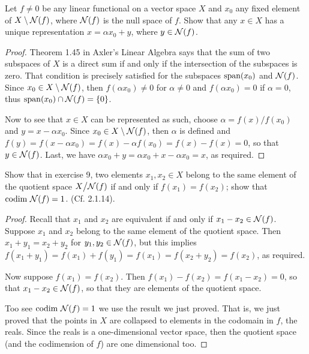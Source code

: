 \begin{exercise}{9}
Let $f\neq 0$ be any linear functional on a vector space $X$ and $x_0$ any fixed element of $X\setminus \mathcal{N}(f)$, where $\mathcal{N}(f)$ is the null space of $f$.
Show that any $x\in X$ has a unique representation $x=\alpha x_0+y$, where $y\in\mathcal{N}(f)$.
\end{exercise}
\begin{proof}
Theorem 1.45 in Axler's Linear Algebra says that the sum of two subspaces of $X$ is a direct sum if and only if the intersection of the subspaces is zero.
That condition is precisely satisfied for the subspaces $\operatorname*{span}(x_0)$ and $\mathcal{N}(f)$.
Since $x_0\in X\setminus\mathcal{N}(f)$, then $f(\alpha x_0)\neq 0$ for $\alpha\neq 0$ and $f(\alpha x_0)=0$ if $\alpha=0$, thus $\operatorname*{span}(x_0)\cap \mathcal{N}(f)=\{0\}$.

Now to see that $x\in X$ can be represented as such, choose $\alpha = f(x)/f(x_0)$ and $y=x-\alpha x_0$.
Since $x_0\in X\setminus\mathcal{N}(f)$, then $\alpha$ is defined and $f(y) =f(x-\alpha x_0) =f(x)-\alpha f(x_0) =f(x)-f(x)=0$, so that $y\in\mathcal{N}(f)$.
Last, we have $\alpha x_0+y =\alpha x_0 +x-\alpha x_0=x$, as required.
\end{proof}

\begin{exercise}{10}
Show that in exercise 9, two elements $x_1,x_2\in X$ belong to the same element of the quotient space ${\textstyle X}\big/{\textstyle \mathcal{N}(f)}$ if and only if $f(x_1)=f(x_2)$;
show that $\text{codim }\mathcal{N}(f)=1$.
(Cf. 2.1.14).
\end{exercise}
\begin{proof}
Recall that $x_1$ and $x_2$ are equivalent if and only if $x_1-x_2\in\mathcal{N}(f)$.
Suppose $x_1$ and $x_2$ belong to the same element of the quotient space.
Then $x_1+y_1=x_2+y_2$ for $y_1,y_2\in\mathcal{N}(f)$, but this implies $f(x_1+y_1) =f(x_1)+f(y_1) =f(x_1) =f(x_2+y_2) =f(x_2)$, as required.

Now suppose $f(x_1)=f(x_2)$.
Then $f(x_1)-f(x_2) =f(x_1-x_2) =0$, so that $x_1-x_2\in\mathcal{N}(f)$, so that they are elements of the quotient space.

Too see $\text{codim }\mathcal{N}(f)=1$ we use the result we just proved.
That is, we just proved that the points in $X$ are collapsed to elements in the codomain in $f$, the reals.
Since the reals is a one-dimensional vector space, then the quotient space (and the codimension of $f$) are one dimensional too.
\end{proof}

